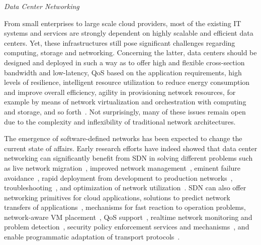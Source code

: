 \vspace{2mm}
\noindent \textit{Data Center Networking}

From small enterprises to large scale cloud providers, most of the existing IT systems and services are strongly dependent on highly scalable and efficient data centers.
Yet, these infrastructures still pose significant challenges regarding computing, storage and networking.
Concerning the latter, data centers should be designed and deployed in such a way as to offer
high and flexible cross-section bandwidth and low-latency, 
QoS based on the application requirements,
high levels of resilience,
intelligent resource utilization to reduce energy consumption and improve overall efficiency,
agility in provisioning network resources, for example by means of network virtualization and orchestration with computing and storage,
and so forth~\cite{Kant20092939,greenberg2008cost,bari2013}.
Not surprisingly, many of these issues remain open due to the complexity and inflexibility of traditional network architectures.

The emergence of software-defined networks has been expected to change the current state of affairs.
Early research efforts have indeed showed that data center networking can significantly benefit from SDN in solving different problems such as live network migration~\cite{keller2012}, improved network management~\cite{keller2012,arefin2013}, eminent failure avoidance~\cite{keller2012,arefin2013}, rapid deployment from development to production networks~\cite{keller2012}, troubleshooting~\cite{keller2012,raghavendra2012}, and optimization of network utilization~\cite{raghavendra2012,wang2012,das2013,arefin2013}.
SDN can also offer networking primitives for cloud applications, solutions to predict network transfers of applications~\cite{wang2012,das2013}, mechanisms for fast reaction to operation problems, network-aware VM placement~\cite{raghavendra2012,benson2011},  QoS support~\cite{raghavendra2012,benson2011}, realtime network monitoring and problem detection~\cite{raghavendra2012,das2013,arefin2013}, security policy enforcement services and mechanisms~\cite{raghavendra2012,benson2011}, and enable programmatic adaptation of transport protocols~\cite{wang2012,ghobadi2013}.

